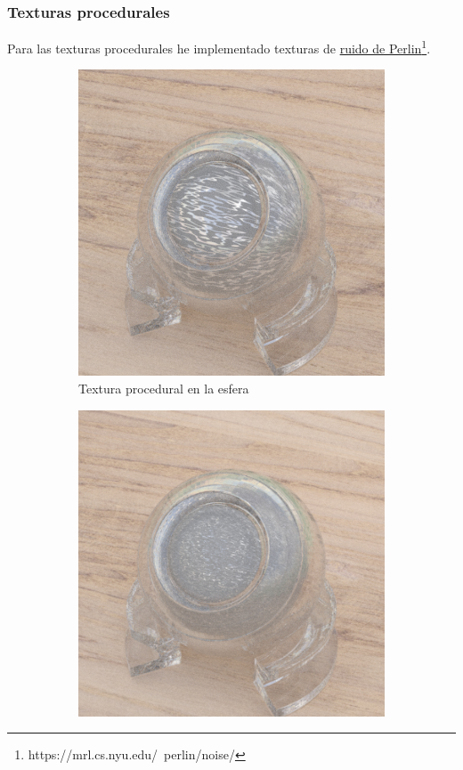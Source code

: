\documentclass{article}
\begin{document}
\subsubsection{Texturas procedurales}

Para las texturas procedurales he implementado texturas de \href{https://mrl.cs.nyu.edu/~perlin/noise/}{ruido de Perlin}\footnote{https://mrl.cs.nyu.edu/~perlin/noise/}.

\begin{figure}[H]
  \begin{subfigure}[h]{0.4\linewidth}
    \includegraphics[width=\linewidth]{imgs/orb.png}
    \caption{Textura procedural en la esfera}
  \end{subfigure}
  \hfill
  \begin{subfigure}[h]{0.4\linewidth}
    \includegraphics[width=\linewidth]{imgs/orbm.png}

\end{subfigure}
\end{figure}
\end{document}
